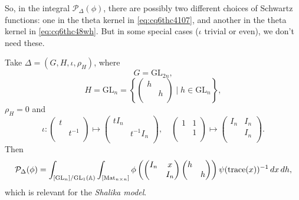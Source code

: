 \documentclass[reqno]{amsart} 
\begin{document}
\begin{enumerate}
  So, in the integral $\mathcal{P}_\Delta(\phi)$, there are possibly two different choices of Schwartz functions: one in the theta kernel in \eqref{eq:cq6thc4107}, and another in the theta kernel in \eqref{eq:cq6thc48wh}.  But in some special cases ($\iota$ trivial or even), we don't need these.
\end{enumerate}

\begin{example}\label{example:cq6tho3o9b}
  Take $\Delta =(G, H, \iota, \rho_H)$, where
  \begin{equation*}
    G =\mathrm{GL}_{2 n},
  \end{equation*}
  \begin{equation*}
    H = \mathrm{GL}_n = \left\{
      \begin{pmatrix}
        h        &  \\
                 & h \\
      \end{pmatrix} \mid h \in \mathrm{GL}_n \right\},
  \end{equation*}
  $\rho_H = 0$ and
  \begin{equation*}
    \iota :
    \begin{pmatrix}
      t      &  \\
             & t^{-1} \\
    \end{pmatrix}
    \mapsto
    \begin{pmatrix}
      t I_n &  \\
            & t^{-1} I_n \\
    \end{pmatrix},
    \quad
    \begin{pmatrix}
      1 & 1 \\
        & 1 \\
    \end{pmatrix}
    \mapsto
    \begin{pmatrix}
      I_n      & I_n \\
               & I_n \\
    \end{pmatrix}.
  \end{equation*}
  Then
  \begin{equation*}
    \mathcal{P}_\Delta(\phi) =
    \int_{[\mathrm{GL}_n] / \mathrm{GL}_1(\mathbb{A})}
    \int_{[\operatorname{Mat}_{n \times n}]} \phi \left(
      \begin{pmatrix}
        I_n      & x \\
                 & I_n \\
      \end{pmatrix}
      \begin{pmatrix}
        h &  \\
          & h \\
      \end{pmatrix}      
    \right)
    \psi(\operatorname{trace}(x))^{-1} \, d x
    \, d h,
  \end{equation*}
  which is relevant for the \emph{Shalika model}.
\end{example}
\end{document}

